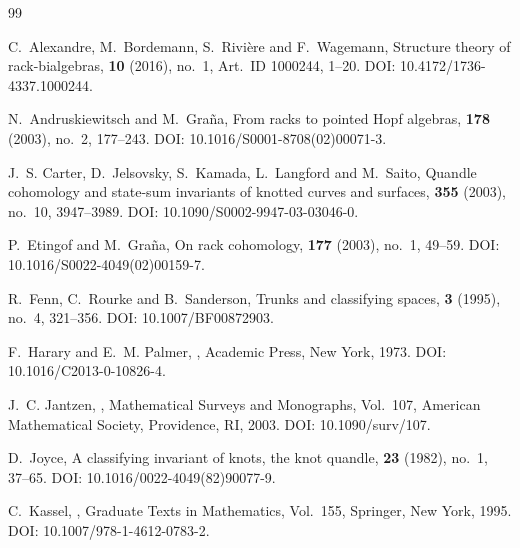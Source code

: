 \documentclass[11pt]{article}
\theoremstyle{plain}
\theoremstyle{definition}
\theoremstyle{remark}
\begin{document}
	\begin{thebibliography}{99}
		
		C.~Alexandre, M.~Bordemann, S.~Rivi\`ere and F.~Wagemann,
		\newblock Structure theory of rack-bialgebras,
		 \textbf{10} (2016), no.~1, Art.~ID 1000244, 1--20.
		\newblock DOI: 10.4172/1736-4337.1000244.
		
		N.~Andruskiewitsch and M.~Gra\~na,
		\newblock From racks to pointed Hopf algebras,
		 \textbf{178} (2003), no.~2, 177--243.
		\newblock DOI: 10.1016/S0001-8708(02)00071-3.
		
		J.~S. Carter, D.~Jelsovsky, S.~Kamada, L.~Langford and M.~Saito,
		\newblock Quandle cohomology and state-sum invariants of knotted curves and surfaces,
		 \textbf{355} (2003), no.~10, 3947--3989.
		\newblock DOI: 10.1090/S0002-9947-03-03046-0.
		
		P.~Etingof and M.~Gra\~na,
		\newblock On rack cohomology,
		 \textbf{177} (2003), no.~1, 49--59.
		\newblock DOI: 10.1016/S0022-4049(02)00159-7.
		
		R.~Fenn, C.~Rourke and B.~Sanderson,
		\newblock Trunks and classifying spaces,
		 \textbf{3} (1995), no.~4, 321--356.
		\newblock DOI: 10.1007/BF00872903.
		
		F.~Harary and E.~M. Palmer,
		,
		\newblock Academic Press, New York, 1973.
		\newblock DOI: 10.1016/C2013-0-10826-4.
		
		J.~C. Jantzen,
		,
		\newblock Mathematical Surveys and Monographs, Vol.~107,
		\newblock American Mathematical Society, Providence, RI, 2003.
		\newblock DOI: 10.1090/surv/107.
		
		D.~Joyce,
		\newblock A classifying invariant of knots, the knot quandle,
		 \textbf{23} (1982), no.~1, 37--65.
		\newblock DOI: 10.1016/0022-4049(82)90077-9.
		
		C.~Kassel,
		,
		\newblock Graduate Texts in Mathematics, Vol.~155, Springer, New York, 1995.
		\newblock DOI: 10.1007/978-1-4612-0783-2.
		

\end{thebibliography}
\end{document}
